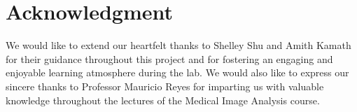 \section*{Acknowledgment}


We would like to extend our heartfelt thanks to Shelley Shu and Amith Kamath for their guidance throughout this project and for fostering an engaging and enjoyable learning atmosphere during the lab. We would also like to express our sincere thanks to Professor Mauricio Reyes for imparting us with valuable knowledge throughout the lectures of the Medical Image Analysis course.